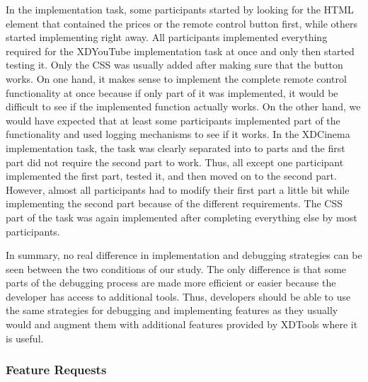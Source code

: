 In the implementation task, some participants started by looking for the HTML element that contained the prices or the remote control button first, while others started implementing right away. All participants implemented everything required for the XDYouTube implementation task at once and only then started testing it. Only the CSS was usually added after making sure that the button works. On one hand, it makes sense to implement the complete remote control functionality at once because if only part of it was implemented, it would be difficult to see if the implemented function actually works. On the other hand, we would have expected that at least some participants implemented part of the functionality and used logging mechanisms to see if it works. In the XDCinema implementation task, the task was clearly separated into to parts and the first part did not require the second part to work. Thus, all except one participant implemented the first part, tested it, and then moved on to the second part. However, almost all participants had to modify their first part a little bit while implementing the second part because of the different requirements. The CSS part of the task was again implemented after completing everything else by most participants.

In summary, no real difference in implementation and debugging strategies can be seen between the two conditions of our study. The only difference is that some parts of the debugging process are made more efficient or easier because the developer has access to additional tools. Thus, developers should be able to use the same strategies for debugging and implementing features as they usually would and augment them with additional features provided by XDTools where it is useful. 

\subsubsection{Feature Requests}

